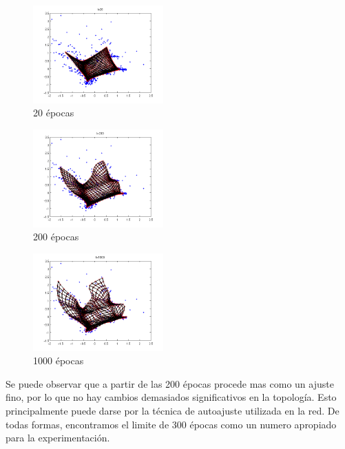 \documentclass[informe.tex]{subfiles}
\begin{document}
	\begin{minipage}{0.30\textwidth}
	  \centering
	  \begin{figure}[H]
	    \centering
	    \includegraphics[height=3.75cm,keepaspectratio]{graficos/tiempo/20.png}
		  \caption{\small 20 \'epocas}
	  \end{figure}
	  
	  \begin{figure}[H]
	    \centering
	    \includegraphics[height=3.75cm,keepaspectratio]{graficos/tiempo/200.png}
		  \caption{\small 200 \'epocas}
	  \end{figure}
	  
	  \begin{figure}[H]
	    \centering
	    \includegraphics[height=3.75cm,keepaspectratio]{graficos/tiempo/1000.png}
		  \caption{\small 1000 \'epocas}
	  \end{figure}
	\end{minipage}
       
       \newpage
       
       Se puede observar que a partir de las 200 \'epocas procede mas como un ajuste fino, por lo que no hay cambios demasiados significativos en la topolog\'ia. Esto principalmente puede darse por la t\'ecnica de autoajuste utilizada en la red. De todas formas, encontramos el limite de 300 \'epocas como un numero apropiado para la experimentaci\'on.
       
\end{document}
